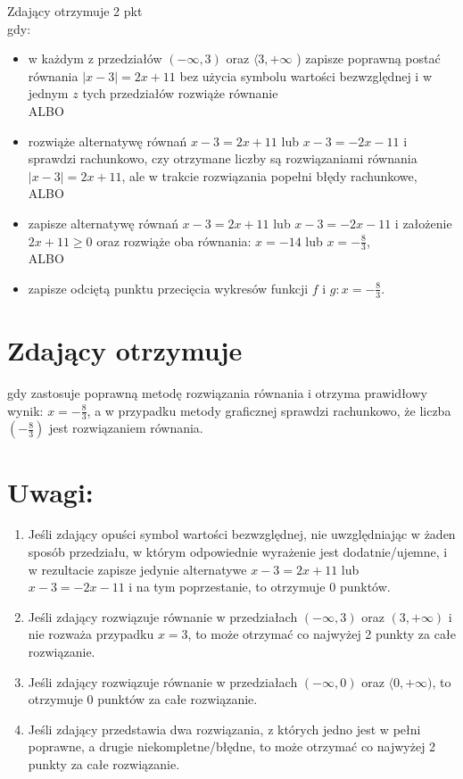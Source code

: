 \documentclass[10pt]{article}
\begin{document}
Zdający otrzymuje 2 pkt\\
gdy:

\begin{itemize}
  \item w każdym z przedziałów $(-\infty, 3)$ oraz $\langle 3,+\infty$ ) zapisze poprawną postać równania $|x-3|=2 x+11$ bez użycia symbolu wartości bezwzględnej i w jednym $z$ tych przedziałów rozwiąże równanie\\
ALBO
  \item rozwiąże alternatywę równań $x-3=2 x+11$ lub $x-3=-2 x-11$ i sprawdzi rachunkowo, czy otrzymane liczby są rozwiązaniami równania $|x-3|=2 x+11$, ale w trakcie rozwiązania popełni błędy rachunkowe,\\
ALBO
  \item zapisze alternatywę równań $x-3=2 x+11$ lub $x-3=-2 x-11$ i założenie $2 x+11 \geq 0$ oraz rozwiąże oba równania: $x=-14$ lub $x=-\frac{8}{3}$,\\
ALBO
  \item zapisze odciętą punktu przecięcia wykresów funkcji $f$ i $g: x=-\frac{8}{3}$.
\end{itemize}

\section*{Zdający otrzymuje}
gdy zastosuje poprawną metodę rozwiązania równania i otrzyma prawidłowy wynik: $x=-\frac{8}{3}$, a w przypadku metody graficznej sprawdzi rachunkowo, że liczba $\left(-\frac{8}{3}\right)$ jest rozwiązaniem równania.

\section*{Uwagi:}
\begin{enumerate}
  \item Jeśli zdający opuści symbol wartości bezwzględnej, nie uwzględniając w żaden sposób przedziału, w którym odpowiednie wyrażenie jest dodatnie/ujemne, i w rezultacie zapisze jedynie alternatywe $x-3=2 x+11$ lub $x-3=-2 x-11$ i na tym poprzestanie, to otrzymuje 0 punktów.
  \item Jeśli zdający rozwiązuje równanie w przedziałach $(-\infty, 3)$ oraz $(3,+\infty)$ i nie rozważa przypadku $x=3$, to może otrzymać co najwyżej 2 punkty za całe rozwiązanie.
  \item Jeśli zdający rozwiązuje równanie w przedziałach $(-\infty, 0)$ oraz $\langle 0,+\infty)$, to otrzymuje 0 punktów za całe rozwiązanie.
  \item Jeśli zdający przedstawia dwa rozwiązania, z których jedno jest w pełni poprawne, a drugie niekompletne/błędne, to może otrzymać co najwyżej 2 punkty za całe rozwiązanie.
\end{enumerate}
\end{document}
